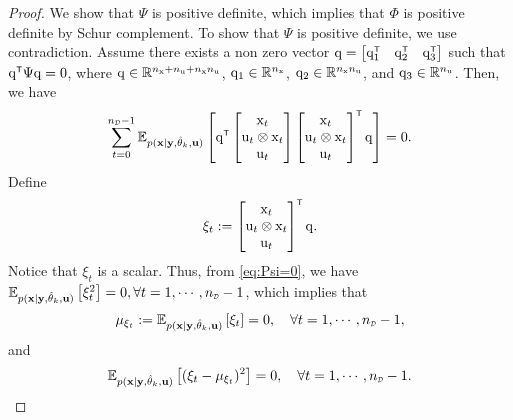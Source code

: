 \begin{proof}
    We show that $\Psi$ is positive definite, which implies that $\Phi$ is positive definite by Schur complement. 
    To show that $\Psi$ is positive definite, we use contradiction. Assume there exists a non zero vector $\vcq = \begin{bmatrix}
        \vcq_1^\tr & \vcq_2^\tr & \vcq_3^\tr
    \end{bmatrix}$
    such that $\vcq^\tr\Psi\vcq = 0$, where ${ \mathrm{q} } \in {\mathbb{R}}^{n_{ \mathrm{x} }+n_{ \mathrm{u} }+n_{ \mathrm{x} }n_{ \mathrm{u} }}$, ${ \mathrm{q} }_1 \in {\mathbb{R}}^{n_{ \mathrm{x} }}$, ${ \mathrm{q} }_2 \in {\mathbb{R}}^{n_{ \mathrm{x} }n_{ \mathrm{u} }}$, and ${ \mathrm{q} }_3 \in {\mathbb{R}}^{n_{ \mathrm{u} }}$. Then, we have
    \begin{equation}\label{eq:Psi=0}
        \sum_{t=0}^{\nD-1} \mathbb{E}_{p(\mathbf{x}|\mathbf{y},\hat{\vctheta}_k,\mathbf{u})} 
        \left[ \vcq^\tr  \begin{bmatrix}
        \vcx_t \\ \vcu_t \otimes \vcx_t \\ \vcu_t
    \end{bmatrix}
    \begin{bmatrix}
        \vcx_t \\ \vcu_t \otimes \vcx_t \\ \vcu_t
    \end{bmatrix}^\tr \vcq  \right] = 0.
    \end{equation}
    Define 
    \begin{equation}
        \xi_t := \begin{bmatrix}
        \vcx_t \\ \vcu_t \otimes \vcx_t \\ \vcu_t
        \end{bmatrix}^\tr \vcq.
    \end{equation} 
    Notice that $\xi_t$ is a scalar. Thus, from \eqref{eq:Psi=0}, we have $\mathbb{E}_{p(\mathbf{x}|\mathbf{y},\hat{\vctheta}_k,\mathbf{u})} 
        \left[\xi_t^2 \right] = 0, \forall t = 1,\cdots,\nD-1$,
    which implies that 
    \begin{equation}\label{eq:mu_xi_t}
        \mu_{\xi_t} := \mathbb{E}_{p(\mathbf{x}|\mathbf{y},\hat{\vctheta}_k,\mathbf{u})} 
        \left[\xi_t \right] = 0, \quad \forall t = 1,\cdots,\nD-1,
    \end{equation}
    and
    \begin{equation}\label{eq:var_xi_t}
        \mathbb{E}_{p(\mathbf{x}|\mathbf{y},\hat{\vctheta}_k,\mathbf{u})} 
        \left[(\xi_t - \mu_{\xi_t})^2 \right] = 0, \quad \forall t = 1,\cdots,\nD-1.
    \end{equation}

\end{proof}
